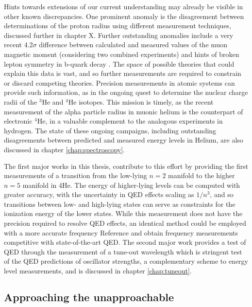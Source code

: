 	Hints towards extensions of our current understanding may already be visible in other known discrepancies.
	One prominent anomaly is the disagreement between determinations of the proton radius using different measurement techniques, discussed further in chapter X.
	Further outstanding anomalies include a very recent 4.2$\sigma$ difference between calculated and measured values of the muon magnetic moment \cite{Abi21} (considering two combined experiments) and hints of broken lepton symmetry in b-quark decay \cite{LHCb21}.
	The space of possible theories that could explain this data is vast, and so further measurements are required to constrain or discard competing theories.
	Precision measurements in atomic systems can provide such information, as in the ongoing quest to determine the nuclear charge radii of the $^3$He and $^4$He isotopes.
	This mission is timely, as the recent measurement of the alpha particle radius in muonic helium \cite{Krauth21} is the counterpart of electronic $^4$He, in a valuable complement to the analogous experiments in hydrogen.
	The state of these ongoing campaigns, including outstanding disagreements between predicted and measured energy levels in Helium, are also discussed in chapter \ref{chap:spectroscopy}.
	
	The first major works in this thesis, contribute to this effort by providing the first measurements of a transition from the low-lying $n=2$ manifold to the higher $n=5$ manifold in 4He.
	The energy of higher-lying levels can be computed with greater accuracy, with the uncertainty in QED effects scaling as $1/n^3$\cite{Ref}, and so transitions between low- and high-lying states can serve as constraints for the ionization energy of the lower states. While this measurement does not have the precision required to resolve QED effects, an identical method could be employed with a more accurate frequency Reference and obtain frequency measurements competitive with state-of-the-art QED.
	The second major work provides a test of QED through the measurement of a tune-out wavelength which is stringent test of the QED predictions of oscillator strengths, a complementary scheme to energy level measurements, and is discussed in chapter \ref{chap:tuneout}.
	
\subsection*{Approaching the unapproachable} %

